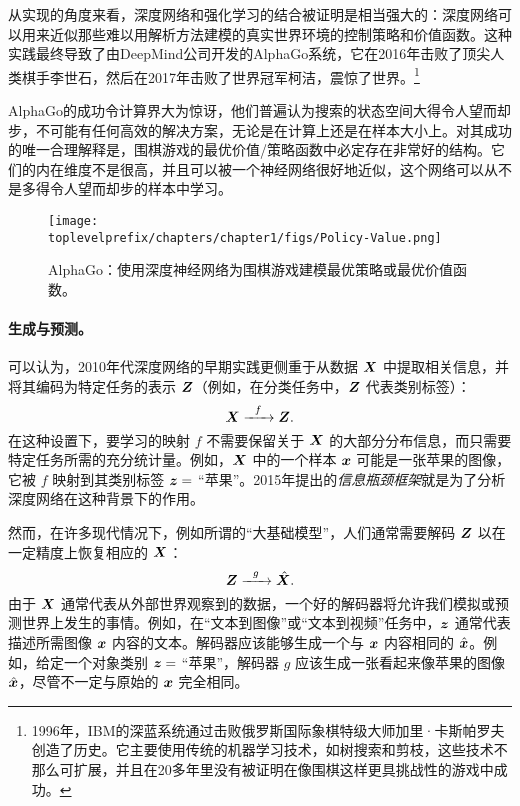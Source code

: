 \documentclass[../../book-main_zh.tex]{subfiles}
\begin{document}
从实现的角度来看，深度网络和强化学习的结合被证明是相当强大的：深度网络可以用来近似那些难以用解析方法建模的真实世界环境的控制策略和价值函数。这种实践最终导致了由DeepMind公司开发的AlphaGo系统，它在2016年击败了顶尖人类棋手李世石，然后在2017年击败了世界冠军柯洁，震惊了世界。\footnote{1996年，IBM的深蓝系统通过击败俄罗斯国际象棋特级大师加里·卡斯帕罗夫创造了历史。它主要使用传统的机器学习技术，如树搜索和剪枝，这些技术不那么可扩展，并且在20多年里没有被证明在像围棋这样更具挑战性的游戏中成功。}

AlphaGo的成功令计算界大为惊讶，他们普遍认为搜索的状态空间大得令人望而却步，不可能有任何高效的解决方案，无论是在计算上还是在样本大小上。对其成功的唯一合理解释是，围棋游戏的最优价值/策略函数中必定存在非常好的结构。它们的内在维度不是很高，并且可以被一个神经网络很好地近似，这个网络可以从不是多得令人望而却步的样本中学习。

\begin{figure}
    \centering
    \texttt{[image: \\toplevelprefix/chapters/chapter1/figs/Policy-Value.png]}
    \caption{AlphaGo：使用深度神经网络为围棋游戏建模最优策略或最优价值函数。}
    \label{fig:Alpha-Go}
\end{figure}

\paragraph{生成与预测。}
可以认为，2010年代深度网络的早期实践更侧重于从数据 $\bm{X}$ 中提取相关信息，并将其编码为特定任务的表示 $\bm{Z}$（例如，在分类任务中，$\bm{Z}$ 代表类别标签）：
\begin{equation}
    \bm{X}   \xrightarrow{\hspace{2mm} f \hspace{2mm}} \bm{Z}.
       \label{eqn:encoding-deep-networks}
\end{equation}
在这种设置下，要学习的映射 $f$ 不需要保留关于 $\bm{X}$ 的大部分分布信息，而只需要特定任务所需的充分统计量。例如，$\bm{X}$ 中的一个样本 $\bm{x}$ 可能是一张苹果的图像，它被 $f$ 映射到其类别标签 $\bm{z} =$ “苹果”。2015年提出的{\em 信息瓶颈框架}\cite{Tishby-ITW2015}就是为了分析深度网络在这种背景下的作用。
 
然而，在许多现代情况下，例如所谓的“大基础模型”，人们通常需要解码 $\bm{Z}$ 以在一定精度上恢复相应的 $\bm{X}$：
\begin{equation}
    \bm{Z}   \xrightarrow{\hspace{2mm} g  \hspace{2mm}} \hat {\bm{X}}.
       \label{eqn:decoding-deep-networks}
\end{equation}
由于 $\bm{X}$ 通常代表从外部世界观察到的数据，一个好的解码器将允许我们模拟或预测世界上发生的事情。例如，在“文本到图像”或“文本到视频”任务中，$\bm{z}$ 通常代表描述所需图像 $\bm{x}$ 内容的文本。解码器应该能够生成一个与 $\bm{x}$ 内容相同的 $\hat {\bm{x}}$。例如，给定一个对象类别 $\bm{z} = $ “苹果”，解码器 $g$ 应该生成一张看起来像苹果的图像 $\hat {\bm{x}}$，尽管不一定与原始的 $\bm{x}$ 完全相同。
\end{document}

